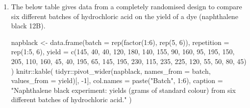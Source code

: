 \documentclass[
]{book}
\newenvironment{Shaded}{\begin{snugshade}}{\end{snugshade}}
\newcommand{\AttributeTok}[1]{\textcolor[rgb]{0.77,0.63,0.00}{#1}}
\newcommand{\DecValTok}[1]{\textcolor[rgb]{0.00,0.00,0.81}{#1}}
\newcommand{\FunctionTok}[1]{\textcolor[rgb]{0.00,0.00,0.00}{#1}}
\newcommand{\NormalTok}[1]{#1}
\newcommand{\OtherTok}[1]{\textcolor[rgb]{0.56,0.35,0.01}{#1}}
\newcommand{\SpecialCharTok}[1]{\textcolor[rgb]{0.00,0.00,0.00}{#1}}
\newcommand{\StringTok}[1]{\textcolor[rgb]{0.31,0.60,0.02}{#1}}
\theoremstyle{definition}
\theoremstyle{definition}
\theoremstyle{definition}
\theoremstyle{definition}
\theoremstyle{remark}
\begin{document}
\begin{enumerate}
\def\labelenumi{\arabic{enumi}.}
\setcounter{enumi}{2}
\item
  The below table gives data from a completely randomised design to compare six different batches of hydrochloric acid on the yield of a dye (naphthalene black 12B).

\begin{Shaded}
\begin{Highlighting}[]
\NormalTok{napblack }\OtherTok{\textless{}{-}} \FunctionTok{data.frame}\NormalTok{(}\AttributeTok{batch =} \FunctionTok{rep}\NormalTok{(}\FunctionTok{factor}\NormalTok{(}\DecValTok{1}\SpecialCharTok{:}\DecValTok{6}\NormalTok{), }\FunctionTok{rep}\NormalTok{(}\DecValTok{5}\NormalTok{, }\DecValTok{6}\NormalTok{)),}
               \AttributeTok{repetition =} \FunctionTok{rep}\NormalTok{(}\DecValTok{1}\SpecialCharTok{:}\DecValTok{5}\NormalTok{, }\DecValTok{6}\NormalTok{), }
               \AttributeTok{yield =} \FunctionTok{c}\NormalTok{(}\DecValTok{145}\NormalTok{, }\DecValTok{40}\NormalTok{, }\DecValTok{40}\NormalTok{, }\DecValTok{120}\NormalTok{, }\DecValTok{180}\NormalTok{, }\DecValTok{140}\NormalTok{, }\DecValTok{155}\NormalTok{, }\DecValTok{90}\NormalTok{, }\DecValTok{160}\NormalTok{, }\DecValTok{95}\NormalTok{,}
                               \DecValTok{195}\NormalTok{, }\DecValTok{150}\NormalTok{, }\DecValTok{205}\NormalTok{, }\DecValTok{110}\NormalTok{, }\DecValTok{160}\NormalTok{, }\DecValTok{45}\NormalTok{, }\DecValTok{40}\NormalTok{, }\DecValTok{195}\NormalTok{, }\DecValTok{65}\NormalTok{, }\DecValTok{145}\NormalTok{,}
                               \DecValTok{195}\NormalTok{, }\DecValTok{230}\NormalTok{, }\DecValTok{115}\NormalTok{, }\DecValTok{235}\NormalTok{, }\DecValTok{225}\NormalTok{, }\DecValTok{120}\NormalTok{, }\DecValTok{55}\NormalTok{, }\DecValTok{50}\NormalTok{, }\DecValTok{80}\NormalTok{, }\DecValTok{45}\NormalTok{)}
\NormalTok{                 )}
\NormalTok{knitr}\SpecialCharTok{::}\FunctionTok{kable}\NormalTok{(}
\NormalTok{tidyr}\SpecialCharTok{::}\FunctionTok{pivot\_wider}\NormalTok{(napblack, }\AttributeTok{names\_from =}\NormalTok{ batch, }\AttributeTok{values\_from =}\NormalTok{ yield)[, }\SpecialCharTok{{-}}\DecValTok{1}\NormalTok{],}
 \AttributeTok{col.names =} \FunctionTok{paste}\NormalTok{(}\StringTok{"Batch"}\NormalTok{, }\DecValTok{1}\SpecialCharTok{:}\DecValTok{6}\NormalTok{),}
 \AttributeTok{caption =} \StringTok{"Naphthalene black experiment: yields (grams of standard colour) from six different batches of hydrochloric acid."}
\NormalTok{)}
\end{Highlighting}
\end{Shaded}


\end{enumerate}
\end{document}
